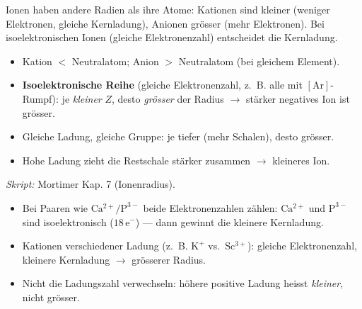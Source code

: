 
Ionen haben andere Radien als ihre Atome: Kationen sind kleiner (weniger
Elektronen, gleiche Kernladung), Anionen grösser (mehr Elektronen). Bei
isoelektronischen Ionen (gleiche Elektronenzahl) entscheidet die Kernladung.

\begin{werkzeugkasten}
\begin{itemize}
  \item Kation  $<$ Neutralatom; Anion $>$ Neutralatom (bei gleichem Element).
  \item \textbf{Isoelektronische Reihe} (gleiche Elektronenzahl, z.\ B. alle
        mit $[\mathrm{Ar}]$-Rumpf): je \textit{kleiner} $Z$, desto \textit{grösser}
        der Radius $\to$ stärker negatives Ion ist grösser.
  \item Gleiche Ladung, gleiche Gruppe: je tiefer (mehr Schalen), desto grösser.
  \item Hohe Ladung zieht die Restschale stärker zusammen $\to$ kleineres Ion.
\end{itemize}
\textit{Skript:} Mortimer Kap. 7 (Ionenradius).
\end{werkzeugkasten}

\begin{achtung}
\begin{itemize}
  \item Bei Paaren wie $\mathrm{Ca^{2+}}/\mathrm{P^{3-}}$ beide Elektronenzahlen
        zählen: $\mathrm{Ca^{2+}}$ und $\mathrm{P^{3-}}$ sind isoelektronisch
        ($18\,\mathrm{e^-}$) --- dann gewinnt die kleinere Kernladung.
  \item Kationen verschiedener Ladung (z.\ B. $\mathrm{K^+}$ vs.\ $\mathrm{Sc^{3+}}$):
        gleiche Elektronenzahl, kleinere Kernladung $\to$ grösserer Radius.
  \item Nicht die Ladungszahl verwechseln: höhere positive Ladung heisst
        \textit{kleiner}, nicht grösser.
\end{itemize}
\end{achtung}
